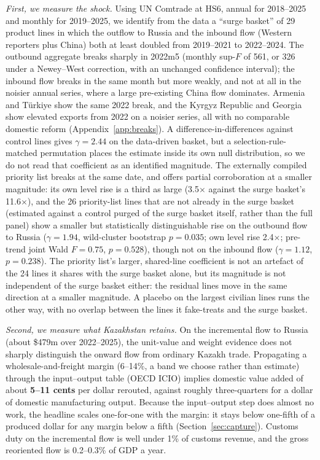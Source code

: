\documentclass[12pt]{article}
\begin{document}
\emph{First, we measure the shock.} Using UN Comtrade at HS6, annual for 2018--2025 and
monthly for 2019--2025, we identify from the data a ``surge basket'' of 29 product lines in
which the outflow to Russia and the inbound flow (Western reporters plus China) both at least
doubled from 2019--2021 to 2022--2024. The outbound aggregate breaks sharply in 2022m5 (monthly
sup-$F$ of 561, or 326 under a Newey--West correction, with an unchanged confidence interval);
the inbound flow breaks in the same month but more weakly, and not at all in the noisier annual
series, where a large pre-existing China flow dominates. Armenia and T\"urkiye show the same
2022 break, and the Kyrgyz Republic and Georgia show elevated exports from 2022 on a noisier
series, all with no comparable domestic reform (Appendix~\ref{app:breaks}). A difference-in-differences against
control lines gives $\gamma = 2.44$ on the data-driven basket, but a selection-rule-matched
permutation places the estimate inside its own null distribution, so we do not read that
coefficient as an identified magnitude. The externally compiled priority list breaks at the
same date, and offers partial corroboration at a smaller magnitude: its own level rise is a
third as large (3.5$\times$ against the surge basket's 11.6$\times$), and the 26 priority-list
lines that are not already in the surge basket (estimated against a control purged of the
surge basket itself, rather than the full panel) show a smaller but statistically
distinguishable rise on the outbound flow to Russia ($\gamma = 1.94$, wild-cluster bootstrap
$p = 0.035$; own level rise 2.4$\times$; pre-trend joint Wald $F = 0.75$, $p = 0.528$), though
not on the inbound flow ($\gamma = 1.12$,
$p = 0.238$). The priority list's larger, shared-line coefficient is not an artefact of the 24
lines it shares with the surge basket alone, but its magnitude is not independent of the
surge basket either: the residual lines move in the same direction at a smaller magnitude.
A placebo on the largest civilian lines runs the other way, with no
overlap between the lines it fake-treats and the surge basket.

\emph{Second, we measure what Kazakhstan retains.} On the incremental flow to Russia (about
\$479m over 2022--2025), the unit-value and weight evidence does not sharply distinguish the
onward flow from ordinary Kazakh trade. Propagating a wholesale-and-freight margin
(6--14\%, a band we choose rather than estimate) through the input--output table (OECD ICIO)
implies domestic value added of about \textbf{5--11 cents} per dollar rerouted, against roughly
three-quarters for a dollar of domestic manufacturing output. Because the input--output step
does almost no work, the headline scales one-for-one with the margin: it stays below one-fifth
of a produced dollar for any margin below a fifth (Section~\ref{sec:capture}). Customs duty
on the incremental flow is well under 1\% of customs revenue, and the gross reoriented flow is
0.2--0.3\% of GDP a year.
\end{document}

